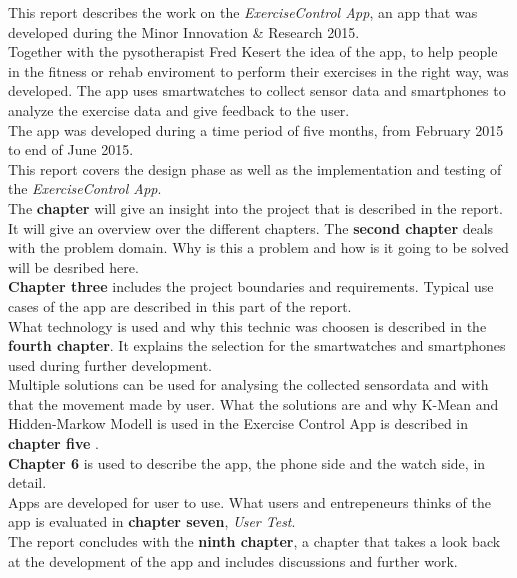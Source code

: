 This report describes the work on the \emph{ExerciseControl App}, an app that was developed during the Minor Innovation \& Research 2015.\\
Together with the pysotherapist Fred Kesert the idea of the app, to help people in the fitness or rehab enviroment to perform their exercises in the right way, was developed. The app uses smartwatches to collect sensor data and smartphones to analyze the exercise data and give feedback to the user. \\
The app was developed during a time period of five months, from February 2015 to end of June 2015. \\
This report covers the design phase as well as the implementation and testing of the \emph{ExerciseControl App}.\\
The \textbf{chapter} will give an insight into the project that is described in the report. It will give an overview over the different chapters.
The \textbf{second chapter} deals with the problem domain. Why is this a problem and how is it going to be solved will be desribed here.\\
\textbf{Chapter three} includes the project boundaries and requirements. Typical use cases of the app are described in this part of the report.  
\\
What technology is used and why this technic was choosen is described in the \textbf{fourth chapter}. It explains the selection for the smartwatches and smartphones used during further development.
\\
 Multiple solutions can be used for analysing the collected sensordata and with that the movement made by user. What the solutions are and why K-Mean and Hidden-Markow Modell is used in the Exercise Control App is described in \textbf{chapter five} .
\\
\textbf{Chapter 6} is used to describe the app, the phone side and the watch side, in detail. 
\\
Apps are developed for user to use. What users and entrepeneurs thinks of the app is evaluated in \textbf{chapter seven}, \emph{User Test}.
\\
The report concludes with the \textbf{ninth chapter}, a chapter that takes a look back at the development of the app and includes discussions and further work. 